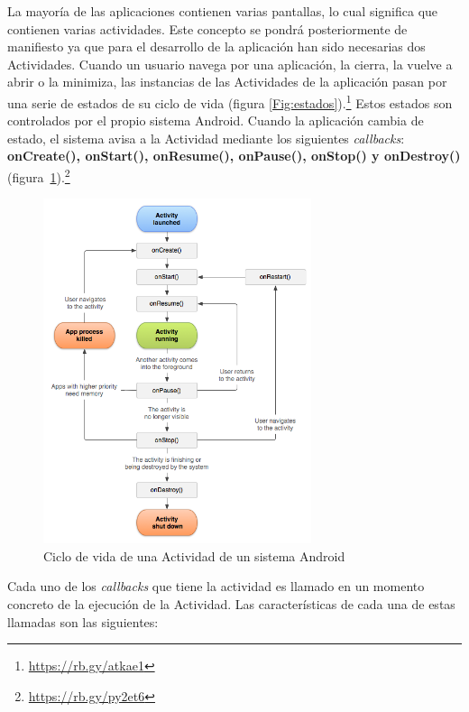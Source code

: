 La mayor\'ia de las aplicaciones contienen varias pantallas, lo cual significa que contienen varias actividades. Este concepto se pondr\'a posteriormente de manifiesto ya que para el desarrollo de la aplicaci\'on han sido necesarias dos Actividades.
Cuando un usuario navega por una aplicaci\'on, la cierra, la vuelve a abrir o la minimiza, las instancias de las Actividades de la aplicaci\'on pasan por una serie de estados de su ciclo de vida (figura \ref{Fig:estados}).\footnote{\url{https://rb.gy/atkae1}} Estos estados son controlados por el propio sistema Android. Cuando la aplicaci\'on cambia de estado, el sistema avisa a la Actividad mediante los siguientes \emph{callbacks}: \textbf{onCreate(), onStart(), onResume(), onPause(), onStop() y onDestroy()} (figura~\ref{ciclo}).\footnote{\url{https://rb.gy/py2et6}}\\

\begin{figure}[h]

\centering
\includegraphics[width=0.7\textwidth]{./Imagenes/Bitmap/Ciclo_de_vida_Android}
\caption{Ciclo de vida de una Actividad de un sistema Android}
\label{ciclo}
\end{figure}

Cada uno de los \emph{callbacks} que tiene la actividad es llamado en un momento concreto de la ejecuci\'on de la Actividad. Las caracter\'isticas de cada una de estas llamadas son las siguientes:\\

